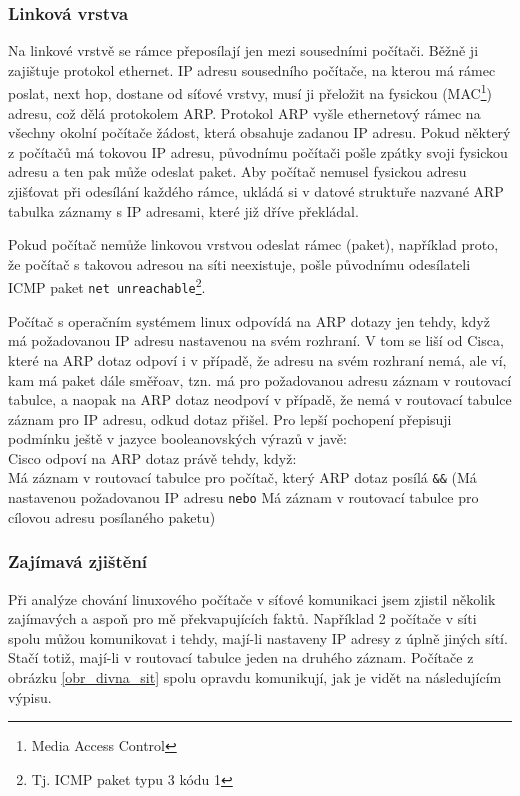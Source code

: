 \subsubsection{Linková vrstva}\label{skutecna_linkova_vrstva}

Na linkové vrstvě se rámce přeposílají jen mezi sousedními počítači. Běžně ji zajištuje protokol ethernet. IP adresu sousedního počítače, na kterou má rámec poslat, next hop, dostane od síťové vrstvy, musí ji přeložit na fysickou (MAC\footnote{Media Access Control}) adresu, což dělá protokolem ARP. Protokol ARP vyšle ethernetový rámec na všechny okolní počítače žádost, která obsahuje zadanou IP adresu. Pokud některý z počítačů má tokovou IP adresu, původnímu počítači pošle zpátky svoji fysickou adresu a ten pak může odeslat paket. Aby počítač nemusel fysickou adresu zjišťovat při odesílání každého rámce, ukládá si v datové struktuře nazvané ARP tabulka záznamy s IP adresami, které již dříve překládal.

Pokud počítač nemůže linkovou vrstvou odeslat rámec (paket), například proto, že počítač s takovou adresou na síti neexistuje,  pošle původnímu odesílateli ICMP paket \verb|net unreachable|\footnote{Tj. ICMP paket typu 3 kódu 1}.

Počítač s operačním systémem linux odpovídá na ARP dotazy jen tehdy, když má požadovanou IP adresu nastavenou na svém rozhraní. V tom se liší od Cisca, které na ARP dotaz odpoví i v případě, že adresu na svém rozhraní nemá, ale ví, kam má paket dále směřoav, tzn. má pro požadovanou adresu záznam v routovací tabulce, a naopak na ARP dotaz neodpoví v případě, že nemá v routovací tabulce záznam pro IP adresu, odkud dotaz přišel. Pro lepší pochopení přepisuji podmínku ještě v jazyce booleanovských výrazů v javě:\\
Cisco odpoví na ARP dotaz právě tehdy, když:\\
Má záznam v routovací tabulce pro počítač, který ARP dotaz posílá \verb|&&| (Má nastavenou požadovanou IP adresu \verb|nebo| Má záznam v routovací tabulce pro cílovou adresu posílaného paketu)

\subsubsection{Zajímavá zjištění}

Při analýze chování linuxového počítače v síťové komunikaci jsem zjistil několik zajímavých a aspoň pro mě překvapujících faktů. Například 2 počítače v síti spolu můžou komunikovat i tehdy, mají-li nastaveny IP adresy z úplně jiných sítí. Stačí totiž, mají-li v routovací tabulce jeden na druhého záznam. Počítače z obrázku \ref{obr_divna_sit} spolu opravdu komunikují, jak je vidět na následujícím výpisu.

